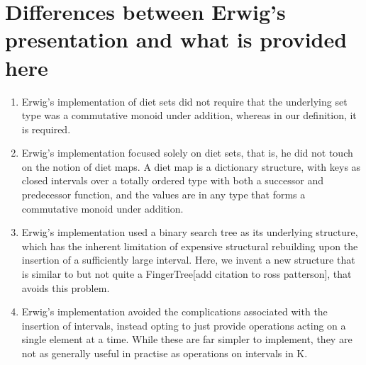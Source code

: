 \documentclass[a4paper]{article}
\begin{document}
\section{Differences between Erwig's presentation and what is provided here}
\begin{enumerate}
\item Erwig's implementation of diet sets did not require that the underlying set type was a commutative monoid under addition, whereas in our definition, it is required.
\item Erwig's implementation focused solely on diet sets, that is, he did not touch on the notion of diet maps. A diet map is a dictionary structure, with keys as closed intervals over a totally ordered type with both a successor and predecessor function, and the values are in any type that forms a commutative monoid under addition.
\item Erwig's implementation used a binary search tree as its underlying structure, which has the inherent limitation of expensive structural rebuilding upon the insertion of a sufficiently large interval. Here, we invent a new structure that is similar to but not quite a FingerTree[add citation to ross patterson], that avoids this problem.
\item Erwig's implementation avoided the complications associated with the insertion of intervals, instead opting to just provide operations acting on a single element at a time. While these are far simpler to implement, they are not as generally useful in practise as operations on intervals in K.
\end{enumerate}

\section{}





\end{document}
